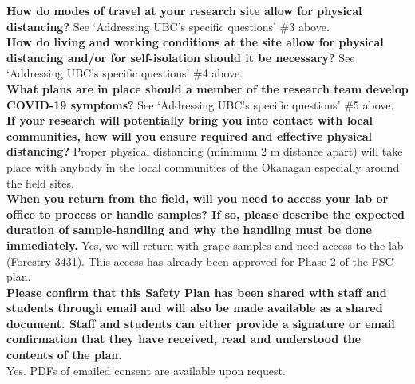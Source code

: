 \documentclass[11pt,letter]{article}
\begin{document}
\textbf{How do modes of travel at your research site allow for physical distancing?}
See `Addressing UBC's specific questions' \#3 above. \\

\textbf{How do living and working conditions at the site allow for physical distancing and/or for self-isolation should it be necessary?}
See `Addressing UBC's specific questions' \#4  above. \\ 

\textbf{What plans are in place should a member of the research team develop COVID-19 symptoms?}
See `Addressing UBC's specific questions' \#5 above. \\ 

\textbf{If your research will potentially bring you into contact with local communities, how will you ensure required and effective physical distancing?}
Proper physical distancing (minimum 2 m distance apart) will take place with anybody in the local communities of the Okanagan especially around the field sites. \\

\textbf{When you return from the field, will you need to access your lab or office to process or handle samples?  If so, please describe the expected duration of sample-handling and why the handling must be done immediately.}
Yes, we will return with grape samples and need access to the lab (Forestry 3431). This access has already been approved for Phase 2 of the FSC plan.\\ 

\textbf{Please confirm that this Safety Plan has been shared with staff and students through email and will also be made available as a shared document.   Staff and students can either provide a signature or email confirmation that they have received, read and understood the contents of the plan.}\\

Yes. PDFs of emailed consent are available upon request.
\end{document}
